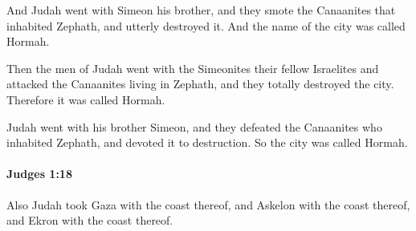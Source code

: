 			\begin{versebox}
					\item[BHS] 
					\item[ASV] And Judah went with Simeon his brother, and they smote the Canaanites that inhabited Zephath, and utterly destroyed it. And the name of the city was called Hormah.
					\item[NIV] Then the men of Judah went with the Simeonites their fellow Israelites and attacked the Canaanites living in Zephath, and they totally destroyed the city. Therefore it was called Hormah.
					\item[NRSV] Judah went with his brother Simeon, and they defeated the Canaanites who inhabited Zephath, and devoted it to destruction. So the city was called Hormah.
			\end{versebox}

		\paragraph{Judges 1:18} %
			\label{JUDGES-1-18}

			Also Judah took Gaza with the coast thereof, and Askelon with the coast thereof, and Ekron with the coast thereof.

